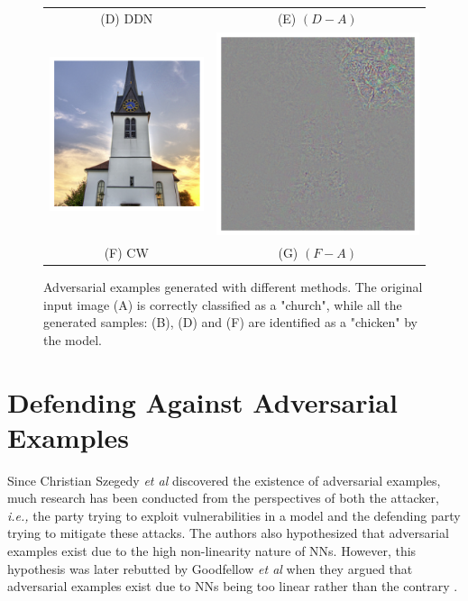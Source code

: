 \begin{figure}[htb]
\begin{tabular}{@{}cc@{}}
        \\
        (D) DDN & (E) $(D - A)$ \\
        \includegraphics[width=.32\columnwidth]{Figures/related/attacks/cw_0.62_chicken.png}
                &
        \includegraphics[width=.32\columnwidth]{Figures/related/attacks/cw_0.62_chicken_diff2.png}
        \\
        (F) CW  & (G) $(F - A)$
    \end{tabular}
    \caption{ Adversarial examples generated with different methods. The
        original input image (A) is correctly classified as a "church", while
        all the generated samples: (B), (D) and (F) are identified as a
        "chicken" by the model. }
    \label{fig:samples_ae}
\end{figure}

\clearpage


\section{Defending Against Adversarial Examples}
\label{sec:defending_adgainst_adversarial_examples}

Since Christian Szegedy \emph{et al} \cite{szegedy_intriguing_2014} discovered
the existence of adversarial examples, much research has been conducted from the
perspectives of both the attacker, \emph{i.e.,} the party trying to exploit
vulnerabilities in a model and the defending party trying to mitigate these
attacks. The authors also hypothesized that adversarial examples exist due to
the high non-linearity nature of NNs. However, this hypothesis was later
rebutted by Goodfellow \emph{et al} when they argued that adversarial examples
exist due to NNs being too linear rather than the contrary
\cite{goodfellow_explaining_2015}.

